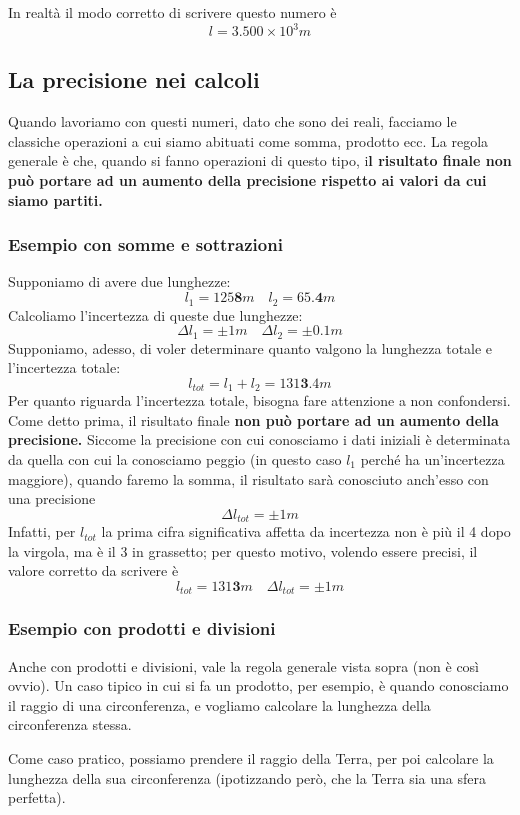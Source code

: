\documentclass[a4paper]{book}
\begin{document}
 In realtà il modo corretto di scrivere questo numero è
 $$ l = 3.500 \times  10^{3} m$$
 
\subsection{La precisione nei calcoli}
Quando lavoriamo con questi numeri, dato che sono dei reali, facciamo le classiche operazioni a cui siamo abituati come somma, prodotto ecc. La regola generale è che, quando si fanno operazioni di questo tipo, i\textbf{l risultato finale non può portare ad un aumento della precisione rispetto ai valori da cui siamo partiti.}

\subsubsection{Esempio con somme e sottrazioni}
Supponiamo di avere due lunghezze:
$$ l_{1} = 125\textbf{8}m  \quad l_{2} = 65.\textbf{4}m $$
Calcoliamo l'incertezza di queste due lunghezze:
$$ \Delta l_{1} = \pm 1m  \quad \Delta l_{2} = \pm 0.1m $$
Supponiamo, adesso, di voler determinare quanto valgono la lunghezza totale e l'incertezza totale:
$$ l_{tot} = l_{1} + l_{2} = 131\textbf{3}.4m $$
Per quanto riguarda l'incertezza totale, bisogna fare attenzione a non confondersi. Come detto prima, il risultato finale \textbf{non può portare ad un aumento della precisione.} Siccome la precisione con cui conosciamo i dati iniziali è determinata da quella con cui la conosciamo peggio (in questo caso $l_{1}$ perché ha un'incertezza maggiore), quando faremo la somma, il risultato sarà conosciuto anch'esso con una precisione
$$ \Delta l_{tot} = \pm 1m $$
Infatti,  per $l_{tot}$ la prima cifra significativa affetta da incertezza non è più il 4 dopo la virgola, ma è il 3 in grassetto; per questo motivo, volendo essere precisi, il valore corretto da scrivere è
$$ l_{tot} = 131\textbf{3}m \quad  \Delta l_{tot} = \pm 1m$$

\subsubsection{Esempio con prodotti e divisioni}
Anche con prodotti e divisioni, vale la regola generale vista sopra (non è così ovvio). Un caso tipico in cui si fa un prodotto, per esempio, è quando conosciamo il raggio di una circonferenza, e vogliamo calcolare la lunghezza della circonferenza stessa.

Come caso pratico, possiamo prendere il raggio della Terra, per poi calcolare la lunghezza della sua circonferenza (ipotizzando però, che la Terra sia una sfera perfetta).
\end{document}
